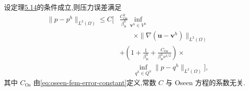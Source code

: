 \begin{theorem}\label{thm:oseen-fem-pressure-error}
设定理\hyperref[thm:oseen-fem-velocity-error]{5.14}的条件成立,则压力误差满足
\begin{equation}\label{eq:oseen-fem-pressure-error}
\begin{aligned}
  \|p-p^h\|_{L^2(\Omega)}
  \le C\Biggl[&
      \frac{C_{\mathrm{Os}}^2}{\beta_{\mathrm{is}}^h}
      \inf_{\bm{v}^h\in V^h}\\
    &\qquad\times\|\nabla(\bm{u}-\bm{v}^h)\|_{L^2(\Omega)}\\
    &+\left(1+\frac{1}{\beta_{\mathrm{is}}^h}
       +\frac{C_{\mathrm{Os}}}{\beta_{\mathrm{is}}^h\nu^{1/2}}\right)\times\\
    &\qquad\inf_{q^h\in Q^h}\|p-q^h\|_{L^2(\Omega)}
      \Biggr],
\end{aligned}
\end{equation}
其中 $C_{\mathrm{Os}}$ 由\cref{eq:oseen-fem-error-constant}定义,常数 $C$ 与 Oseen 方程的系数无关.
\end{theorem}
